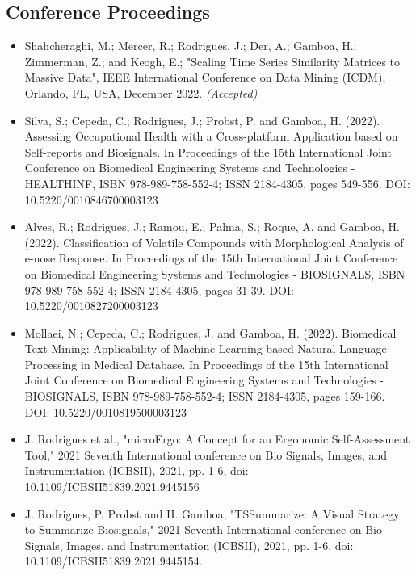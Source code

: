 \subsection{Conference Proceedings}

\begin{itemize}

\item Shahcheraghi, M.; Mercer, R.; Rodrigues, J.; Der, A.; Gamboa, H.; Zimmerman, Z.; and Keogh, E.; "Scaling Time Series Similarity Matrices to Massive Data", IEEE International Conference on Data Mining (ICDM), Orlando, FL, USA, December 2022. \textit{(Accepted)}

\item Silva, S.; Cepeda, C.; Rodrigues, J.; Probst, P. and Gamboa, H. (2022). Assessing Occupational Health with a Cross-platform Application based on Self-reports and Biosignals. In Proceedings of the 15th International Joint Conference on Biomedical Engineering Systems and Technologies - HEALTHINF, ISBN 978-989-758-552-4; ISSN 2184-4305, pages 549-556. DOI: 10.5220/0010846700003123

\item Alves, R.; Rodrigues, J.; Ramou, E.; Palma, S.; Roque, A. and Gamboa, H. (2022). Classification of Volatile Compounds with Morphological Analysis of e-nose Response. In Proceedings of the 15th International Joint Conference on Biomedical Engineering Systems and Technologies - BIOSIGNALS, ISBN 978-989-758-552-4; ISSN 2184-4305, pages 31-39. DOI: 10.5220/0010827200003123

\item Mollaei, N.; Cepeda, C.; Rodrigues, J. and Gamboa, H. (2022). Biomedical Text Mining: Applicability of Machine Learning-based Natural Language Processing in Medical Database. In Proceedings of the 15th International Joint Conference on Biomedical Engineering Systems and Technologies - BIOSIGNALS, ISBN 978-989-758-552-4; ISSN 2184-4305, pages 159-166. DOI: 10.5220/0010819500003123

\item J. Rodrigues et al., "microErgo: A Concept for an Ergonomic Self-Assessment Tool," 2021 Seventh International conference on Bio Signals, Images, and Instrumentation (ICBSII), 2021, pp. 1-6, doi: 10.1109/ICBSII51839.2021.9445156

\item J. Rodrigues, P. Probst and H. Gamboa, "TSSummarize: A Visual Strategy to Summarize Biosignals," 2021 Seventh International conference on Bio Signals, Images, and Instrumentation (ICBSII), 2021, pp. 1-6, doi: 10.1109/ICBSII51839.2021.9445154.


\end{itemize}
